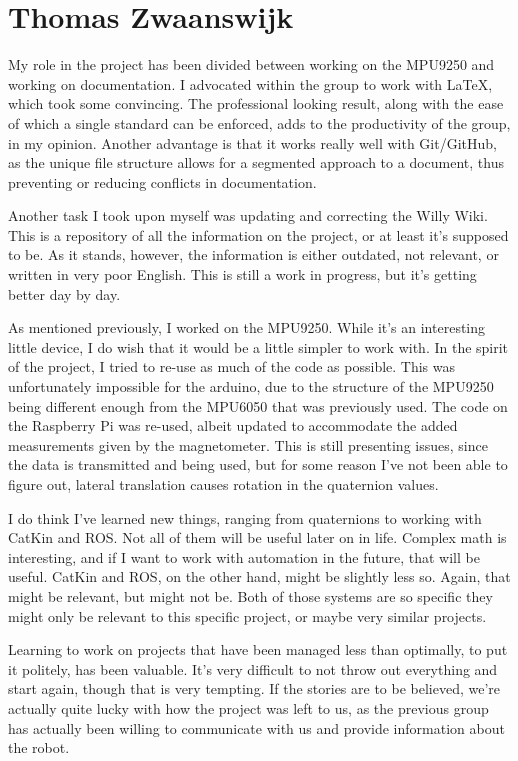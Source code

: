 \section{Thomas Zwaanswijk}
My role in the project has been divided between working on the MPU9250 and working on documentation.
I advocated within the group to work with \LaTeX , which took some convincing.
The professional looking result, along with the ease of which a single standard can be enforced, adds to the productivity of the group, in my opinion.
Another advantage is that it works really well with Git/GitHub, as the unique file structure allows for a segmented approach to a document, thus preventing or reducing conflicts in documentation.

Another task I took upon myself was updating and correcting the Willy Wiki.
This is a repository of all the information on the project, or at least it's supposed to be.
As it stands, however, the information is either outdated, not relevant, or written in very poor English.
This is still a work in progress, but it's getting better day by day.

As mentioned previously, I worked on the MPU9250.
While it's an interesting little device, I do wish that it would be a little simpler to work with.
In the spirit of the project, I tried to re-use as much of the code as possible.
This was unfortunately impossible for the arduino, due to the structure of the MPU9250 being different enough from the MPU6050 that was previously used.
The code on the Raspberry Pi was re-used, albeit updated to accommodate the added measurements given by the magnetometer.
This is still presenting issues, since the data is transmitted and being used, but for some reason I've not been able to figure out, lateral translation causes rotation in the quaternion values.

I do think I've learned new things, ranging from quaternions to working with CatKin and ROS.
Not all of them will be useful later on in life.
Complex math is interesting, and if I want to work with automation in the future, that will be useful.
CatKin and ROS, on the other hand, might be slightly less so.
Again, that might be relevant, but might not be.
Both of those systems are so specific they might only be relevant to this specific project, or maybe very similar projects.

Learning to work on projects that have been managed less than optimally, to put it politely, has been valuable.
It's very difficult to not throw out everything and start again, though that is very tempting.
If the stories are to be believed, we're actually quite lucky with how the project was left to us, as the previous group has actually been willing to communicate with us and provide information about the robot.

